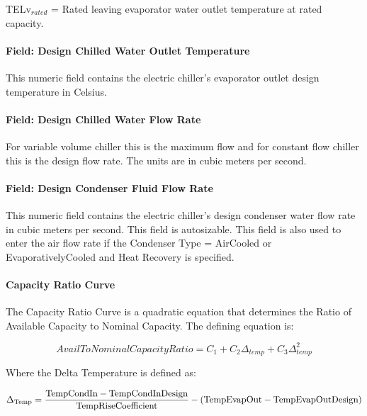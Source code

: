 TELv\(_{rated}\) = Rated leaving evaporator water outlet temperature at rated capacity.

\paragraph{Field: Design Chilled Water Outlet Temperature}\label{field-design-chilled-water-outlet-temperature}

This numeric field contains the electric chiller's evaporator outlet design temperature in Celsius.

\paragraph{Field: Design Chilled Water Flow Rate}\label{field-design-chilled-water-flow-rate-3}

For variable volume chiller this is the maximum flow and for constant flow chiller this is the design flow rate. The units are in cubic meters per second.

\paragraph{Field: Design Condenser Fluid Flow Rate}\label{field-design-condenser-fluid-flow-rate}

This numeric field contains the electric chiller's design condenser water flow rate in cubic meters per second. This field is autosizable. This field is also used to enter the air flow rate if the Condenser Type = AirCooled or EvaporativelyCooled and Heat Recovery is specified.

\paragraph{Capacity Ratio Curve}\label{capacity-ratio-curve}

The Capacity Ratio Curve is a quadratic equation that determines the Ratio of Available Capacity to Nominal Capacity. The defining equation is:

\begin{equation}
    AvailToNominalCapacityRatio = {C_1} + {C_2}{\Delta_{temp}} + {C_3}\Delta_{temp}^2
\end{equation}

Where the Delta Temperature is defined as:

\begin{equation}
{\Delta_{{\rm{Temp}}}}
    = \frac{{{\rm{TempCondIn  -  TempCondInDesign }}}}{{{\rm{TempRiseCoefficient}}}} - ({\rm{TempEvapOut  -  TempEvapOutDesign)}}
\end{equation}


